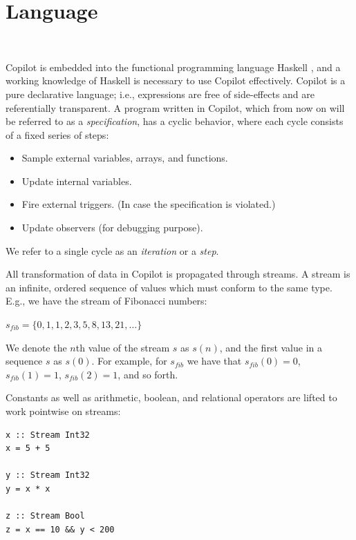 
\section{Language}~\label{sec:language}

Copilot is embedded into the functional programming language Haskell
\cite{PeytonJones02}, and a working knowledge of Haskell is necessary to use
Copilot effectively. Copilot is a pure declarative language; i.e., expressions
are free of side-effects and are referentially transparent.  A program written
in Copilot, which from now on will be referred to as a \emph{specification}, has
a cyclic behavior, where each cycle consists of a fixed series of steps:

\begin{itemize}
\item Sample external variables, arrays, and functions.
\item Update internal variables.
\item Fire external triggers. (In case the specification is violated.)
\item Update observers (for debugging purpose).
\end{itemize}

\noindent We refer to a single cycle as an \emph{iteration} or a \emph{step}.

All transformation of data in Copilot is propagated through streams.
A stream is an infinite, ordered sequence of values which must conform to the same type.
E.g., we have the stream of Fibonacci numbers:

\begin{center}
$s_{fib} = \{0, 1, 1, 2, 3, 5, 8, 13, 21, \dots \}$
\end{center}

\noindent We denote the $n$th value of the stream $s$ as $s(n)$, and the first
value in a sequence $s$ as $s(0)$. For example, for $s_{fib}$ we have that $s_{fib}(0) = 0$,
$s_{fib}(1) = 1$, $s_{fib}(2) = 1$, and so forth.

Constants as well as arithmetic, boolean, and relational operators are
lifted to work pointwise on streams:

\noindent
\begin{lstlisting}[language = Copilot, frame = single]
x :: Stream Int32
x = 5 + 5

y :: Stream Int32
y = x * x

z :: Stream Bool
z = x == 10 && y < 200
\end{lstlisting}


